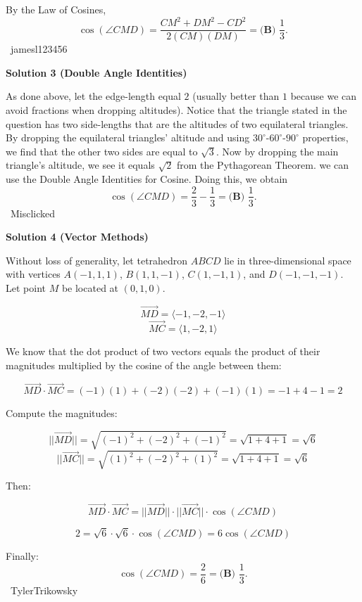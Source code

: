 \begin{enumerate}
 By the Law of Cosines, 
 \[\cos(\angle CMD) = \frac{CM^2 + DM^2 - CD^2}{2(CM)(DM)} = \boxed{\textbf{(B) } \frac13}.\]~jamesl123456

 



\textbf{Solution 3 (Double Angle Identities)}

As done above, let the edge-length equal $2$ (usually better than $1$ because we can avoid fractions when dropping altitudes). Notice that the triangle stated in the question has two side-lengths that are the altitudes of two equilateral triangles. By dropping the equilateral triangles' altitude and using $30^{\circ}$-$60^{\circ}$-$90^{\circ}$ properties, we find that the other two sides are equal to $\sqrt{3}$. Now by dropping the main triangle's altitude, we see it equals $\sqrt{2}$ from the Pythagorean Theorem. we can use the Double Angle Identities for Cosine. Doing this, we obtain 
 \[\cos(\angle CMD) = \frac{2}{3} - \frac13 = \boxed{\textbf{(B) } \frac13}.\]~Misclicked

 



\textbf{Solution 4 (Vector Methods)}

Without loss of generality, let tetrahedron $ABCD$ lie in three-dimensional space with vertices $A(-1, 1, 1)$, $B(1, 1, -1)$, $C(1, -1, 1)$, and $D(-1, -1, -1)$.  Let point $M$ be located at $(0, 1, 0)$.

 
 \[\vec{MD} = \langle -1, -2, -1 \rangle\] 
 \[\vec{MC} = \langle 1, -2, 1 \rangle\]

 We know that the dot product of two vectors equals the product of their magnitudes multiplied by the cosine of the angle between them:

 
 \[\vec{MD} \cdot \vec{MC} = (-1)(1) + (-2)(-2) + (-1)(1) = -1 + 4 - 1 = 2\]

 Compute the magnitudes:

 
 \[||\vec{MD}|| = \sqrt{(-1)^2 + (-2)^2 + (-1)^2} = \sqrt{1 + 4 + 1} = \sqrt{6}\] 
 \[||\vec{MC}|| = \sqrt{(1)^2 + (-2)^2 + (1)^2} = \sqrt{1 + 4 + 1} = \sqrt{6}\]

 Then:

 
 \[\vec{MD} \cdot \vec{MC} = ||\vec{MD}|| \cdot ||\vec{MC}|| \cdot \cos(\angle CMD)\]

 \[2 = \sqrt{6} \cdot \sqrt{6} \cdot \cos(\angle CMD) = 6 \cos(\angle CMD)\]

 Finally: 
 \[\cos(\angle CMD) = \frac{2}{6} = \boxed{\textbf{(B) } \frac13}.\]~TylerTrikowsky


\end{enumerate}
